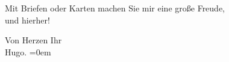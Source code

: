 \pstart
           Mit Briefen oder Karten machen Sie mir eine große Freude,{\\}und hierher!\pend
           
\pstart
           Von Herzen Ihr{\\[\baselineskip]}\spacefill\mbox{Hugo.}\pend
           \leftskip=0em{}\endnumbering{}  \newcommand{\dateiname}{L00841}\newcommand{\titel}{Hugo von Hofmannsthal an Arthur Schnitzler, 30. 8. 1898}\newcommand{\editorInnen}{Martin Anton Müller und Gerd-Hermann Susen}
